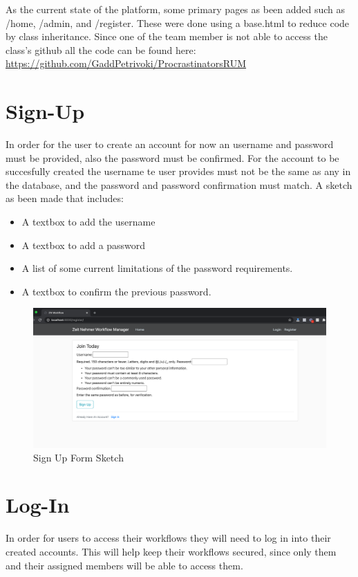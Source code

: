 \documentclass{article}
\begin{document}
As the current state of the platform, some primary pages as been added such as /home, /admin, and /register. These were done using a base.html to reduce code by class inheritance. Since one of the team member is not able to access the class's github all the code can be found here:\\
\url{https://github.com/GaddPetrivoki/ProcrastinatorsRUM}

\section{Sign-Up}
  In order for the user to create an account for now an username and password must be provided, also the password must be confirmed. For the account to be succesfully created the username te user provides must not be the same as any in the database, and the password and password confirmation must match. A sketch as been made that includes:
  \begin{itemize}
    \item A textbox to add the username
    \item A textbox to add a password
    \item A list of some current limitations of the password requirements.
    \item A textbox to confirm the previous password.
  \end{itemize}

  \begin{figure}[h!]
      \centering
      \includegraphics[scale=0.75]{Images/signupMock.png}
      \caption{Sign Up Form Sketch}
      \label{fig:figure 2}
  \end{figure}

\section{Log-In}

  In order for users to access their workflows they will need to log in into their created accounts. This will help keep their workflows secured, since only them and their assigned members will be able to access them.
\end{document}
